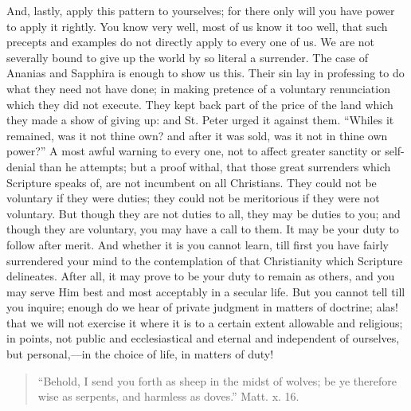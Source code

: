 And, lastly, apply this pattern to yourselves; for there only will
you have power to apply it rightly. You know very well, most of us
know it too well, that such precepts and examples do not directly
apply to every one of us. We are not severally bound to give up the
world by so literal a surrender. The case of Ananias and Sapphira is
enough to show us this. Their sin lay in professing to do what they
need not have done; in making pretence of a voluntary renunciation
which they did not execute. They kept back part of the price of the
land which they made a show of giving up: and St. Peter urged it
against them. ``Whiles it remained, was it not thine own? and
after it was sold, was it not in thine own power?'' A most awful
warning to every one, not to affect greater sanctity or self-denial
than he attempts; but a proof withal, that those great surrenders
which Scripture speaks of, are not incumbent on all Christians. They
could not be voluntary if they were duties; they could not be
meritorious if they were not voluntary. But though they are not duties
to all, they may be duties to you; and though they are voluntary, you
may have a call to them. It may be your duty to follow after merit.
And whether it is you cannot learn, till first you have fairly
surrendered your mind to the contemplation of that Christianity which
Scripture delineates. After all, it may prove to be your duty to
remain as others, and you may serve Him best and most acceptably in a
secular life. But you cannot tell till you inquire; enough do we hear
of private judgment in matters of doctrine; alas! that we will not
exercise it where it is to a certain extent allowable and religious;
in points, not public and ecclesiastical and eternal and independent
of ourselves, but personal,—in the choice of life, in matters of
duty!


\begin{quote}

``Behold, I send you forth as sheep in the midst of wolves;
be ye therefore wise as serpents, and harmless as doves.'' Matt.
x. 16.

\end{quote}

